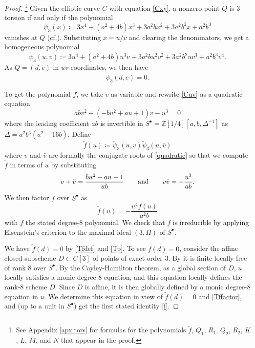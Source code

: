 \documentclass{gtpart}
\theoremstyle{definition}
\theoremstyle{remark}
\newcommand{\mb}[1]{\mathbb{#1}}
\newcommand{\cf}{cf.\thinspace}
\newcommand{\BZ}{{\mb Z}}
\newcommand{\Tf}{\widetilde{f}}
\newcommand{\Tp}{\widetilde{\psi}}
\newcommand{\ad}{{\rm and}}
\newcommand{\s}{S^\bullet}
\begin{document}
\begin{proof}
 \footnote{See Appendix \ref{apx:tors} for formulas for the polynomials $\Tf$, $Q_1$, $R_1$, $Q_2$, $R_2$, $K$, $L$, $M$, and $N$ that appear in the proof.  }
 Given the elliptic curve $C$ with equation \eqref{Cxy}, a nonzero point $Q$ is 3-torsion if and only if the polynomial 
 \[
  \psi_3 (x) \coloneqq 3 x^4 + (a^2 + 4 b) x^3 + 3 a^2 b x^2 + 3 a^2 b^2 x + a^2 b^3 
 \]
 vanishes at $Q$ (\cf \cite[Exercise 3.7f]{AEC}).  Substituting $x = u / v$ and clearing the denominators, we get a homogeneous polynomial 
 \[
  \Tp_3(u,v) \coloneqq 3 u^4 + (a^2 + 4 b) u^3 v + 3 a^2 b u^2 v^2 + 3 a^2 b^2 u v^3 + a^2 b^3 v^4.  
 \]
 As $Q = (d,e)$ in $uv$-coordinates, we then have 
 \begin{equation}
 \label{Tp}
  \Tp_3(d,e) = 0.  
 \end{equation}

 To get the polynomial $f$, we take $v$ as variable and rewrite \eqref{Cuv} as a quadratic equation 
 \begin{equation}
 \label{quadratic}
  a b v^2 + (-b u^2 + a u + 1) v - u^3 = 0 
 \end{equation}
 where the leading coefficient $a b$ is invertible in $\s = \BZ [1/4] [a, b, \Delta^{-1}]$ as $\Delta = a^2 b^4 (a^2 - 16 b)$.  
 Define 
 \begin{equation}
 \label{Tfdef}
  \Tf(u) \coloneqq \Tp_3(u,v) \Tp_3(u,\bar{v}) 
 \end{equation}
 where $v$ and $\bar{v}$ are formally the conjugate roots of \eqref{quadratic} 
 so that we compute $\Tf$ in terms of $u$ by substituting 
 \[
  v + \bar{v} = \frac{b u^2 - a u - 1}{a b} \qquad \ad \qquad v \bar{v} = -\frac{u^3}{a b}.  
 \]
 We then factor $\Tf$ over $\s$ as 
 \begin{equation}
 \label{Tffactor}
  \Tf(u) = -\frac{u^4 f(u)}{a^2 b} 
 \end{equation}
 with $f$ the stated degree-8 polynomial.  
 We check that $f$ is irreducible by applying Eisenstein's criterion to the maximal ideal $(3,H)$ of $\s$.  

 We have $\Tf(d) = 0$ by \eqref{Tfdef} and \eqref{Tp}.  
 To see $f(d) = 0$, consider the affine closed subscheme $D \subset C[3]$ of points of exact order 3.  
 By \cite[2.3.1]{KM} it is finite locally free of rank 8 over $\s$.  
 By the Cayley-Hamilton theorem, as a global section of $D$, $u$ locally satisfies a monic degree-8 equation, 
 and this equation locally defines the rank-8 scheme $D$.  
 Since $D$ is affine, it is then globally defined by a monic degree-8 equation in $u$.  
 We determine this equation in view of $\Tf(d) = 0$ and \eqref{Tffactor}, and (up to a unit in $\s$) get the first stated identity \eqref{f}.  


\end{proof}
\end{document}
